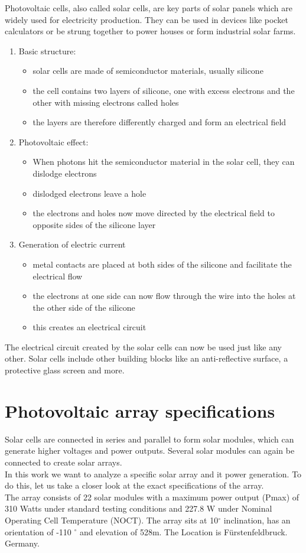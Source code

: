 \documentclass{article}
\begin{document}
Photovoltaic cells, also called solar cells, are key parts of solar panels which are widely used for electricity production. They can be used in devices like pocket calculators or be strung together to power houses or form industrial solar farms.\\
\begin{enumerate}
	\item Basic structure: \begin{itemize}
			\item solar cells are made of semiconductor materials, usually silicone
			\item the cell contains two layers of silicone, one with excess electrons and the other with missing electrons called holes
			\item the layers are therefore differently charged and form an electrical field
	\end{itemize}
	\item Photovoltaic effect: \begin{itemize}
		\item When photons hit the semiconductor material in the solar cell, they can dislodge electrons
		\item dislodged electrons leave a hole
		\item the electrons and holes now move directed by the electrical field to opposite sides of the silicone layer
	\end{itemize}
	\item Generation of electric current \begin{itemize}
		\item metal contacts are placed at both sides of the silicone and facilitate the electrical flow
		\item the electrons at one side can now flow through the wire into the holes at the other side of the silicone
		\item this creates an electrical circuit
	\end{itemize}
\end{enumerate}
The electrical circuit created by the solar cells can now be used just like any other. Solar cells include other building blocks like an anti-reflective surface, a protective glass screen and more. \citep{SolarCells}

\section{Photovoltaic array specifications}
Solar cells are connected in series and parallel to form solar modules, which can generate higher voltages and power outputs.
Several solar modules can again be connected to create solar arrays.\\
In this work we want to analyze a specific solar array and it power generation. To do this, let us take a closer look at the exact specifications of the array.\\
The array consists of 22 solar modules with a maximum power output (Pmax) of 310 Watts under standard testing conditions and 227.8 W  under Nominal Operating Cell Temperature (NOCT).
The array sits at 10$^\circ$ inclination, has an orientation of -110 $^\circ$ and elevation of 528m. The Location is Fürstenfeldbruck. Germany.
\end{document}
